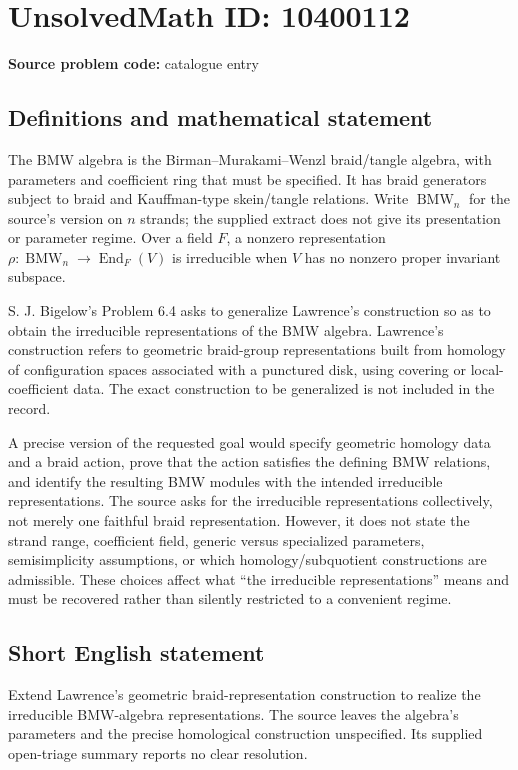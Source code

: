 \documentclass[11pt]{article}
\begin{document}
\section*{UnsolvedMath ID: 10400112}
\textbf{Source problem code:} catalogue entry
\subsection{Definitions and mathematical statement}
The BMW algebra is the Birman--Murakami--Wenzl braid/tangle algebra, with parameters and coefficient ring that must be specified. It has braid generators subject to braid and Kauffman-type skein/tangle relations. Write \(\operatorname{BMW}_n\) for the source's version on \(n\) strands; the supplied extract does not give its presentation or parameter regime. Over a field \(F\), a nonzero representation \(\rho:\operatorname{BMW}_n\to\operatorname{End}_F(V)\) is irreducible when \(V\) has no nonzero proper invariant subspace.

S. J. Bigelow's Problem 6.4 asks to generalize Lawrence's construction so as to obtain the irreducible representations of the BMW algebra. Lawrence's construction refers to geometric braid-group representations built from homology of configuration spaces associated with a punctured disk, using covering or local-coefficient data. The exact construction to be generalized is not included in the record.

A precise version of the requested goal would specify geometric homology data and a braid action, prove that the action satisfies the defining BMW relations, and identify the resulting BMW modules with the intended irreducible representations. The source asks for the irreducible representations collectively, not merely one faithful braid representation. However, it does not state the strand range, coefficient field, generic versus specialized parameters, semisimplicity assumptions, or which homology/subquotient constructions are admissible. These choices affect what ``the irreducible representations'' means and must be recovered rather than silently restricted to a convenient regime.
\subsection{Short English statement}
Extend Lawrence's geometric braid-representation construction to realize the irreducible BMW-algebra representations. The source leaves the algebra's parameters and the precise homological construction unspecified. Its supplied open-triage summary reports no clear resolution.
\end{document}
